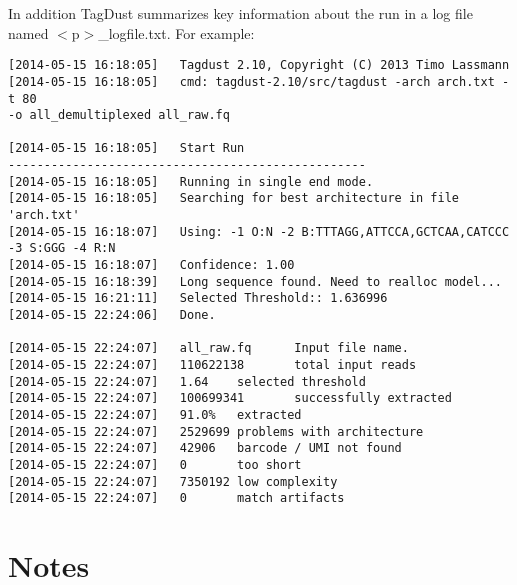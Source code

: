 \documentclass[11pt,a4paper,oneside]{book}
\begin{document}
In addition TagDust summarizes key information about the run in a log file named $<$p$>$\_logfile.txt. For example:
	
{\small
\begin{verbatim}
[2014-05-15 16:18:05]   Tagdust 2.10, Copyright (C) 2013 Timo Lassmann
[2014-05-15 16:18:05]   cmd: tagdust-2.10/src/tagdust -arch arch.txt -t 80 
-o all_demultiplexed all_raw.fq 

[2014-05-15 16:18:05]   Start Run
--------------------------------------------------
[2014-05-15 16:18:05]   Running in single end mode.
[2014-05-15 16:18:05]   Searching for best architecture in file 'arch.txt'
[2014-05-15 16:18:07]   Using: -1 O:N -2 B:TTTAGG,ATTCCA,GCTCAA,CATCCC  -3 S:GGG -4 R:N 
[2014-05-15 16:18:07]   Confidence: 1.00
[2014-05-15 16:18:39]   Long sequence found. Need to realloc model...
[2014-05-15 16:21:11]   Selected Threshold:: 1.636996
[2014-05-15 22:24:06]   Done.

[2014-05-15 22:24:07]   all_raw.fq      Input file name.
[2014-05-15 22:24:07]   110622138       total input reads
[2014-05-15 22:24:07]   1.64    selected threshold
[2014-05-15 22:24:07]   100699341       successfully extracted
[2014-05-15 22:24:07]   91.0%   extracted
[2014-05-15 22:24:07]   2529699 problems with architecture
[2014-05-15 22:24:07]   42906   barcode / UMI not found
[2014-05-15 22:24:07]   0       too short
[2014-05-15 22:24:07]   7350192 low complexity
[2014-05-15 22:24:07]   0       match artifacts
\end{verbatim}
}

\section{Notes}

\end{document}
